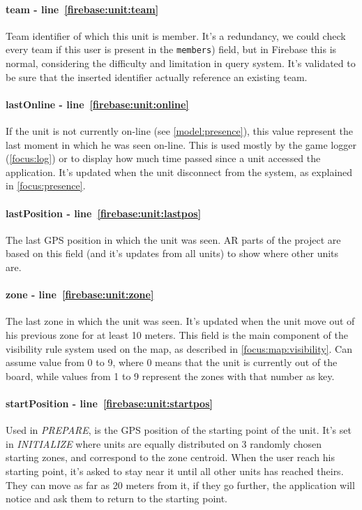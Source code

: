 				\paragraph{team - line~\ref{firebase:unit:team}}
				Team identifier of which this unit is member. It's a redundancy, we could check every team if this user is present in the \lstinline|members|) field, but in Firebase this is normal, considering the difficulty and limitation in query system.
				It's validated to be sure that the inserted identifier actually reference an existing team.
			
				\paragraph{lastOnline - line~\ref{firebase:unit:online}}
				If the unit is not currently on-line (see \autoref{model:presence}), this value represent the last moment in which he was seen on-line. This is used mostly by the game logger (\autoref{focus:log}) or to display how much time passed since a unit accessed the application. It's updated when the unit disconnect from the system, as explained in \autoref{focus:presence}.
				
				\paragraph{lastPosition - line~\ref{firebase:unit:lastpos}}
				The last GPS position in which the unit was seen. AR parts of the project are based on this field (and it's updates from all units) to show where other units are.
			
				\paragraph{zone - line~\ref{firebase:unit:zone}}
				The last zone in which the unit was seen. It's updated when the unit move out of his previous zone for at least 10 meters. This field is the main component of the visibility rule system used on the map, as described in \autoref{focus:map:visibility}. Can assume value from 0 to 9, where 0 means that the unit is currently out of the board, while values from 1 to 9 represent the zones with that number as key.
				
				\paragraph{startPosition - line~\ref{firebase:unit:startpos}}
				Used in \emph{PREPARE}, is the GPS position of the starting point of the unit. It's set in \emph{INITIALIZE} where units are equally distributed on 3 randomly chosen starting zones, and correspond to the zone centroid.
				When the user reach his starting point, it's asked to stay near it until all other units has reached theirs. They can move as far as 20 meters from it, if they go further, the application will notice and ask them to return to the starting point.
				
